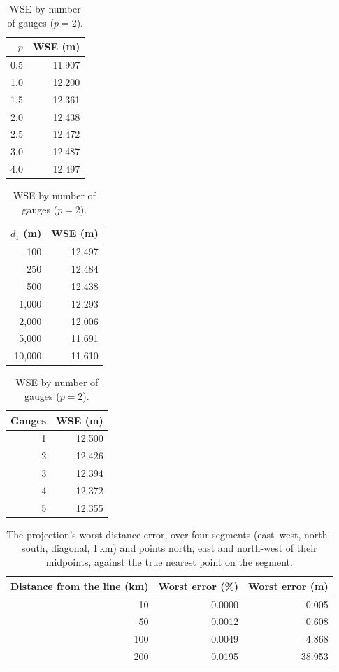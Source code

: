 \documentclass[11pt,a4paper]{article}
\begin{document}
\begin{table}[H]
\centering\small
\begin{minipage}[t]{0.3\textwidth}\centering
\caption{WSE by power.}\label{tab:sens_power}
\begin{tabular}{rr}
\toprule
$p$ & WSE (m) \\
\midrule
0.5 & 11.907 \\ 1.0 & 12.200 \\ 1.5 & 12.361 \\ 2.0 & 12.438 \\ 2.5 & 12.472 \\
3.0 & 12.487 \\ 4.0 & 12.497 \\
\bottomrule
\end{tabular}
\end{minipage}\hfill
\begin{minipage}[t]{0.32\textwidth}\centering
\caption{WSE by the first gauge's distance ($p=2$).}\label{tab:sens_distance}
\begin{tabular}{rr}
\toprule
$d_1$ (m) & WSE (m) \\
\midrule
100 & 12.497 \\ 250 & 12.484 \\ 500 & 12.438 \\ 1{,}000 & 12.293 \\ 2{,}000 & 12.006 \\
5{,}000 & 11.691 \\ 10{,}000 & 11.610 \\
\bottomrule
\end{tabular}
\end{minipage}\hfill
\begin{minipage}[t]{0.3\textwidth}\centering
\caption{WSE by number of gauges ($p=2$).}\label{tab:sens_ngauges}
\begin{tabular}{rr}
\toprule
Gauges & WSE (m) \\
\midrule
1 & 12.500 \\ 2 & 12.426 \\ 3 & 12.394 \\ 4 & 12.372 \\ 5 & 12.355 \\
\bottomrule
\end{tabular}
\end{minipage}
\end{table}

\begin{table}[H]
\centering\small
\caption{The projection's worst distance error, over four segments (east--west,
north--south, diagonal, 1\,km) and points north, east and north-west of their midpoints,
against the true nearest point on the segment.}\label{tab:proj}
\begin{tabular}{rrr}
\toprule
Distance from the line (km) & Worst error (\%) & Worst error (m) \\
\midrule
10 & 0.0000 & 0.005 \\ 50 & 0.0012 & 0.608 \\ 100 & 0.0049 & 4.868 \\ 200 & 0.0195 & 38.953 \\
\bottomrule
\end{tabular}
\end{table}
\end{document}

